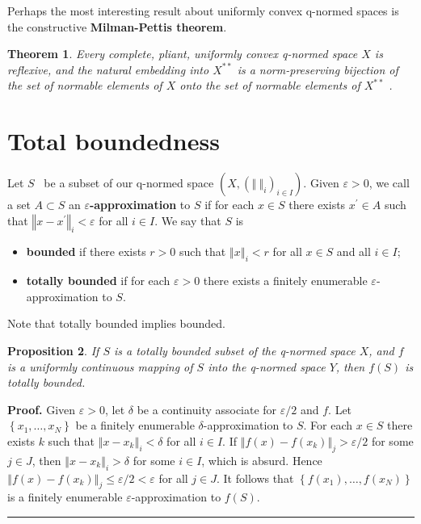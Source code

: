 \documentclass[11pt]{article}%
\newtheorem{theorem}{Theorem}
\newtheorem{proposition}[theorem]{Proposition}
\newenvironment{proof}[1][Proof]{\noindent\textbf{#1.} }{\ \rule{0.5em}{0.5em}}
\begin{document}
Perhaps the most interesting result about uniformly convex q-normed spaces is
the constructive \textbf{Milman-Pettis theorem}.

\begin{theorem}
\label{mar05t1}Every complete, pliant, uniformly convex q-normed space $X$ is
reflexive, and the natural embedding into $X^{\ast\ast}$ is a norm-preserving
bijection of the set of normable elements of $X$ onto the set of normable
elements of $X^{\ast\ast}$ \emph{\cite[Theorem 3]{dsbconvex}}.
\end{theorem}

\section{Total boundedness}

Let $S$ \ be a subset of our q-normed space $\left(  X,\left(  \left\Vert
\ \right\Vert _{i}\right)  _{i\in I}\right)  $. Given $\varepsilon>0$, we call
a set $A\subset S$ an $\varepsilon$\textbf{-approximation} to $S$ if for each
$x\in S$ there exists $x^{\prime}\in A$ such that $\left\Vert x-x^{\prime
}\right\Vert _{i}<\varepsilon$ for all $i\in I$. We say that $S$ is

\begin{itemize}
\item \textbf{bounded }if there exists $r>0$ such that $\left\Vert
x\right\Vert _{i}<r$ for all $x\in S$ and all $i\in I$;

\item \textbf{totally bounded }if for each $\varepsilon>0$ there exists a
finitely enumerable $\varepsilon$-approximation to $S$.
\end{itemize}

%

\noindent
Note that totally bounded implies bounded.

\begin{proposition}
\label{feb28p3}If $S$ is a totally bounded subset of the q-normed space $X$,
and $f$ is a uniformly continuous mapping of $S$ into the q-normed space $Y$,
then $f(S)$ is totally bounded.
\end{proposition}

\begin{proof}
Given $\varepsilon>0$, let $\delta$ be a continuity associate for
$\varepsilon/2$ and $f$. Let $\left\{  x_{1},\ldots,x_{N}\right\}  $ be a
finitely enumerable $\delta$-approximation to $S$. For each $x\in S$ there
exists $k$ such that $\left\Vert x-x_{k}\right\Vert _{i}<\delta$ for all $i\in
I$. If $\left\Vert f(x)-f(x_{k})\right\Vert _{j}>\varepsilon/2$ for some $j\in
J$, then $\left\Vert x-x_{k}\right\Vert _{i}>\delta$ for some $i\in I$, which
is absurd. Hence $\left\Vert f(x)-f(x_{k})\right\Vert _{j}\leq\varepsilon
/2<\varepsilon$ for all $j\in J$. It follows that $\left\{  f(x_{1}%
),\ldots,f(x_{N})\right\}  $ is a finitely enumerable $\varepsilon
$-approximation to $f(S)$.
\end{proof}
\end{document}
